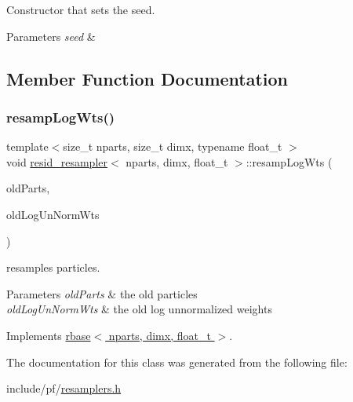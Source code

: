 Constructor that sets the seed. 


\begin{DoxyParams}{Parameters}
{\em seed} & \\
\hline
\end{DoxyParams}


\subsection{Member Function Documentation}
\mbox{\label{classresid__resampler_ae6957cd1e080ac4313e6b0bc5ae9aa96}} 
\subsubsection{\texorpdfstring{resamp\+Log\+Wts()}{resampLogWts()}}
{\footnotesize\ttfamily template$<$size\+\_\+t nparts, size\+\_\+t dimx, typename float\+\_\+t $>$ \\
void \hyperlink{classresid__resampler}{resid\+\_\+resampler}$<$ nparts, dimx, float\+\_\+t $>$\+::resamp\+Log\+Wts (\begin{DoxyParamCaption}\item[{\hyperlink{classrbase_aa12fc826befa6ba0647b5f59ebc396ee}{array\+Vec} \&}]{old\+Parts,  }\item[{\hyperlink{classrbase_a6f76bef853e508cb5b6f546d231b06f5}{array\+Float} \&}]{old\+Log\+Un\+Norm\+Wts }\end{DoxyParamCaption})\hspace{0.3cm}{\ttfamily [virtual]}}



resamples particles. 


\begin{DoxyParams}{Parameters}
{\em old\+Parts} & the old particles \\
\hline
{\em old\+Log\+Un\+Norm\+Wts} & the old log unnormalized weights \\
\hline
\end{DoxyParams}


Implements \hyperlink{classrbase_aff0f6f88fd4656e67f5ebc870f10dd44}{rbase$<$ nparts, dimx, float\+\_\+t $>$}.



The documentation for this class was generated from the following file\+:\begin{DoxyCompactItemize}
\item 
include/pf/\hyperlink{resamplers_8h}{resamplers.\+h}\end{DoxyCompactItemize}
